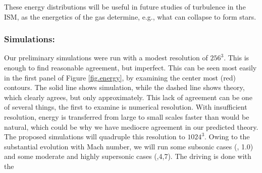 These energy distributions will be useful
in future studies of turbulence in the ISM, as the energetics of the gas
determine, e.g., what can collapse to form stars.  

\subsubsection{Simulations: \nameTurbulence}
\label{subsec.turb_sims}

Our preliminary simulations were run with a modest resolution of $256^3$.  This
is enough to find reasonable agreement, but imperfect. This can be seen most
easily in the first panel of Figure \ref{fig.energy}, by examining the center
most (red) contours. The solid line shows simulation, while the dashed line
shows theory, which clearly agrees, but only approximately.  This lack of
agreement can be one of several things, the first to examine is numerical
resolution.  With insufficient resolution, energy is transferred from large to
small scales faster than would be natural, which could be why we have mediocre
agreement in our predicted theory.  The proposed simulations will quadruple this
resolution to $1024^3$.  Owing to the substantial evolution with Mach number, we
will run some subsonic cases (, 1.0) and some moderate and highly
supersonic cases (,4,7).  The driving is done with the 
